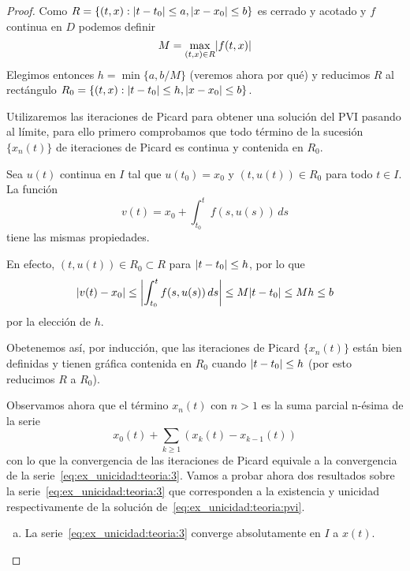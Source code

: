 \documentclass[../ecuaciones_diferenciales.tex]{subfiles}
\begin{document}
\begin{proof}
    Como \(R = \{(t, x) : \abs{t - t_0} \leq a, \abs{x - x_0} \leq b\}\) es cerrado y acotado 
    y \(f\) continua en \(D\) podemos definir
    \[
        M = \max_{(t, x) \in R} \abs{f(t, x)}
    \]
    Elegimos entonces \(h = \min\{a, b / M\}\) (veremos ahora por qué) y reducimos \(R\)
    al rectángulo \(R_0 = \{(t, x) : \abs{t - t_0} \leq h, \abs{x - x_0} \leq b\}\).

    Utilizaremos las iteraciones de Picard para obtener una solución del PVI pasando al límite, para ello primero
    comprobamos que todo término de la sucesión \(\{x_n(t)\}\) de iteraciones de Picard es continua y contenida en \(R_0\).

    Sea \(u(t)\) continua en \(I\)
    tal que \(u(t_0) = x_0\) y \((t, u(t)) \in R_0\) para todo \(t \in I\). La función
    \[
        v(t) = x_0 + \int_{t_0}^t f(s, u(s)) \, ds
    \]
    tiene las mismas propiedades.

    En efecto, \((t, u(t)) \in R_0 \subset R\) para \(\abs{t - t_0} \leq h\), por lo que
    \[
        \abs{v(t) - x_0} \leq \abs{\int_{t_0}^t f(s, u(s)) \, ds} \leq M \abs{t - t_0} \leq Mh \leq b
    \]
    por la elección de \(h\).

    Obetenemos así, por inducción, que las iteraciones de Picard \(\{x_n(t)\}\) están bien definidas
    y tienen gráfica contenida en \(R_0\) cuando \(\abs{t - t_0} \leq h\) (por esto reducimos \(R\) a \(R_0\)).

    Observamos ahora que el término \(x_n(t)\) con \(n > 1\) es la suma parcial n-ésima de la serie
    \begin{equation} \label{eq:ex_unicidad:teoria:3}
        x_0(t) + \sum_{k \geq 1} (x_k(t) - x_{k - 1}(t))
    \end{equation}
    con lo que la convergencia de las iteraciones de Picard equivale a la convergencia de la serie~\ref{eq:ex_unicidad:teoria:3}.
    Vamos a probar ahora dos resultados sobre la serie~\ref{eq:ex_unicidad:teoria:3} que corresponden a la existencia y unicidad respectivamente
    de la solución de~\ref{eq:ex_unicidad:teoria:pvi}.
    \begin{enumerate}[(a)]
        \item La serie~\ref{eq:ex_unicidad:teoria:3} converge absolutamente en \(I\) a \(x(t)\).


\end{enumerate}
\end{proof}
\end{document}
